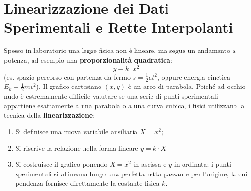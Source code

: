 \documentclass[11pt,a4paper,oneside]{report}
\begin{document}
\section{Linearizzazione dei Dati Sperimentali e Rette Interpolanti}
Spesso in laboratorio una legge fisica non è lineare, ma segue un andamento a potenza, ad esempio una \textbf{proporzionalità quadratica}:
\[
y = k \cdot x^2
\]
(es. spazio percorso con partenza da fermo $s = \frac{1}{2}a t^2$, oppure energia cinetica $E_k = \frac{1}{2}m v^2$).
Il grafico cartesiano $(x, y)$ è un arco di parabola. Poiché ad occhio nudo è estremamente difficile valutare se una serie di punti sperimentali appartiene esattamente a una parabola o a una curva cubica, i fisici utilizzano la tecnica della \textbf{linearizzazione}:
\begin{enumerate}
  \item Si definisce una nuova variabile ausiliaria $X = x^2$;
  \item Si riscrive la relazione nella forma lineare $y = k \cdot X$;
  \item Si costruisce il grafico ponendo $X = x^2$ in ascissa e $y$ in ordinata: i punti sperimentali si allineano lungo una perfetta retta passante per l'origine, la cui pendenza fornisce direttamente la costante fisica $k$.
\end{enumerate}
\end{document}
